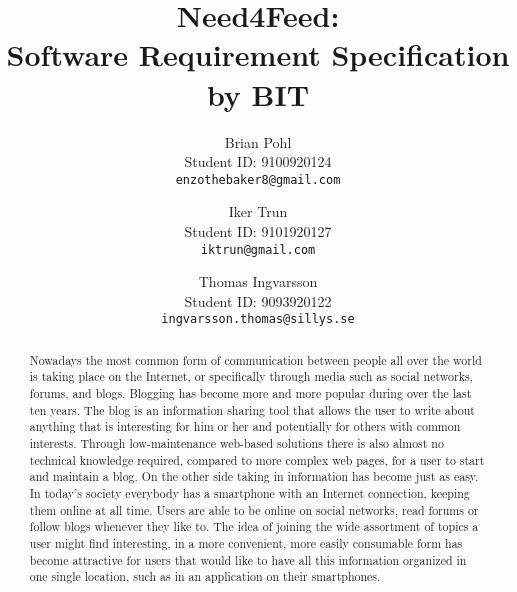 \documentclass[]{article}
\begin{document}
\title{Need4Feed: \\
Software Requirement Specification\\
by BIT}


\author{Brian Pohl\\
Student ID: 9100920124\\
\texttt{enzothebaker8@gmail.com}
\and
Iker Trun\\
Student ID: 9101920127\\
\texttt{iktrun@gmail.com}
\and
Thomas Ingvarsson\\
Student ID: 9093920122\\
\texttt{ingvarsson.thomas@sillys.se}
}


\maketitle


\begin{abstract}
Nowadays the most common form of communication between people all over the world is taking place on the Internet, or specifically through media such as social networks, forums, and blogs. Blogging has become more and more popular during over the last ten years. The blog is an information sharing tool that allows the user to write about anything that is interesting for him or her and potentially for others with common interests. Through low-maintenance web-based solutions there is also almost no technical knowledge required, compared to more complex web pages, for a user to start and maintain a blog. On the other side taking in information has become just as easy. In today's society everybody has a smartphone with an Internet connection, keeping them online at all time. Users are able to be online on social networks, read forums or follow blogs whenever they like to. The idea of joining the wide assortment of topics a user might find interesting, in a more convenient, more easily consumable form has become attractive for users that would like to have all this information organized in one single location, such as in an application on their smartphones.
\end{abstract}





\setcounter{tocdepth}{2}
\tableofcontents




















\end{document}
